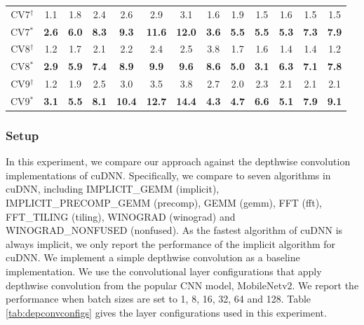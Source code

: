 \begin{table}[]
\begin{threeparttable}
\begin{tabular}{c|cccccc|cccccc}
\hline
CV7$^{\dag}$&1.1 &1.8 &2.4 &2.6 &2.9 &3.1 &1.6 &1.9 &1.5 &1.6 &1.5 &1.5 \\
CV7$^{*}$&\textbf{2.6} &\textbf{6.0} &\textbf{8.3} &\textbf{9.3} &\textbf{11.6} &\textbf{12.0} &\textbf{3.6} &\textbf{5.5} &\textbf{5.5} &\textbf{5.3} &\textbf{7.3} &\textbf{7.9} \\
\hline
CV8$^{\dag}$&1.2 &1.7 &2.1 &2.2 &2.4 &2.5 &3.8 &1.7 &1.6 &1.4 &1.4 &1.2 \\
CV8$^{*}$&\textbf{2.9} &\textbf{5.9} &\textbf{7.4} &\textbf{8.9} &\textbf{9.9} &\textbf{9.6} &\textbf{8.6} &\textbf{5.0} &\textbf{3.1} &\textbf{6.3} &\textbf{7.1} &\textbf{7.8} \\
\hline
CV9$^{\dag}$&1.2 &1.9 &2.5 &3.0 &3.5 &3.8 &2.7 &2.0 &2.3 &2.1 &2.1 &2.1 \\
CV9$^{*}$&\textbf{3.1} &\textbf{5.5} &\textbf{8.1} &\textbf{10.4} &\textbf{12.7} &\textbf{14.4} &\textbf{4.3} &\textbf{4.7} &\textbf{6.6} &\textbf{5.1} &\textbf{7.9} &\textbf{9.1} \\

\bottomrule
\end{tabular}
\end{threeparttable}
\end{table}

%	
%


\subsubsection{Setup} In this experiment, we compare our approach against the depthwise convolution implementations of cuDNN. Specifically, we compare to seven algorithms in cuDNN, including IMPLICIT\_GEMM (implicit), IMPLICIT\_PRECOMP\_GEMM (precomp), GEMM (gemm), FFT (fft), FFT\_TILING (tiling), WINOGRAD (winograd) and WINOGRAD\_NONFUSED (nonfused). 
As the fastest algorithm of cuDNN is always implicit, we only report the performance of the implicit algorithm for cuDNN. 
We implement a simple depthwise convolution as a baseline implementation. 
We use the convolutional layer configurations that apply depthwise convolution from the popular CNN model, MobileNetv2. 
We report the performance when batch sizes are set to 1, 8, 16, 32, 64 and 128. 
Table \ref{tab:depconvconfigs} gives the layer configurations used in this experiment.

